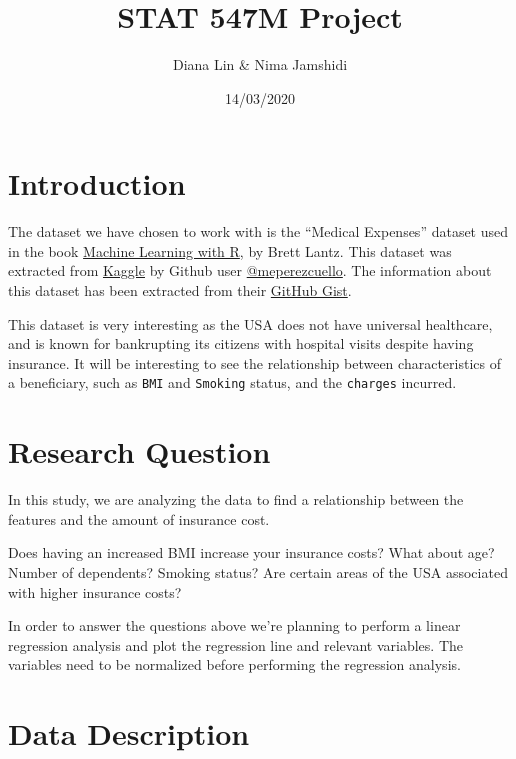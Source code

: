 \documentclass[
]{article}
\title{STAT 547M Project}
\author{Diana Lin \& Nima Jamshidi}
\date{14/03/2020}
\begin{document}
\maketitle

{
\setcounter{tocdepth}{2}
\tableofcontents
}
\hypertarget{introduction}{%
\section{Introduction}\label{introduction}}

The dataset we have chosen to work with is the ``Medical Expenses'' dataset used in the book \href{https://www.amazon.com/Machine-Learning-R-Brett-Lantz/dp/1782162143}{Machine Learning with R}, by Brett Lantz. This dataset was extracted from \href{https://www.kaggle.com/mirichoi0218/insurance/home}{Kaggle} by Github user \href{https://gist.github.com/meperezcuello}{@meperezcuello}. The information about this dataset has been extracted from their \href{https://gist.github.com/meperezcuello/82a9f1c1c473d6585e750ad2e3c05a41}{GitHub Gist}.

This dataset is very interesting as the USA does not have universal healthcare, and is known for bankrupting its citizens with hospital visits despite having insurance. It will be interesting to see the relationship between characteristics of a beneficiary, such as \texttt{BMI} and \texttt{Smoking} status, and the \texttt{charges} incurred.

\hypertarget{research-question}{%
\section{Research Question}\label{research-question}}

In this study, we are analyzing the data to find a relationship between the features and the amount of insurance cost.

Does having an increased BMI increase your insurance costs? What about age? Number of dependents? Smoking status?
Are certain areas of the USA associated with higher insurance costs?

In order to answer the questions above we're planning to perform a linear regression analysis and plot the regression line and relevant variables. The variables need to be normalized before performing the regression analysis.

\hypertarget{data-description}{%
\section{Data Description}\label{data-description}}
\end{document}
